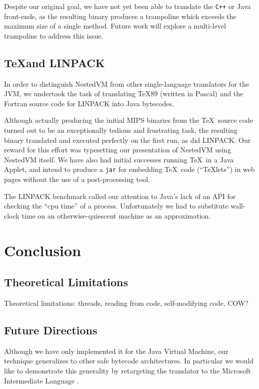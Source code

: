 \documentclass{acmconf}
\begin{document}
Despite our original goal, we have not yet been able to translate the
{\tt C++} or Java front-ends, as the resulting binary produces a
trampoline which exceeds the maximum size of a single method.  Future
work will explore a multi-level trampoline to address this issue.



\subsection{\TeX and LINPACK}

In order to distinguish NestedVM from other single-language
translators for the JVM, we undertook the task of translating \TeX 89
(written in Pascal) and the Fortran source code for LINPACK into Java
bytecodes.

Although actually producing the initial MIPS binaries from the \TeX\
source code turned out to be an exceptionally tedious and frustrating
task, the resulting binary translated and executed perfectly on the
first run, as did LINPACK.  Our reward for this effort was typesetting
our presentation of NestedVM using NestedVM itself.  We have also had
initial successes running \TeX\ in a Java Applet, and intend to
produce a {\tt jar} for embedding \TeX\ code (``\TeX lets'') in web
pages without the use of a post-processing tool.

The LINPACK benchmark called our attention to Java's lack of an API
for checking the ``cpu time'' of a process.  Unfortunately we had to
substitute wall-clock time on an otherwise-quiescent machine as an
approximation.





\section{Conclusion}

\subsection{Theoretical Limitations}

Theoretical limitations: threads, reading from code, self-modifying
code, COW?

\subsection{Future Directions}

Although we have only implemented it for the Java Virtual Machine, our
technique generalizes to other safe bytecode architectures.  In
particular we would like to demonstrate this generality by retargeting
the translator to the Microsoft Intermediate Language \cite{msil}.
\end{document}
